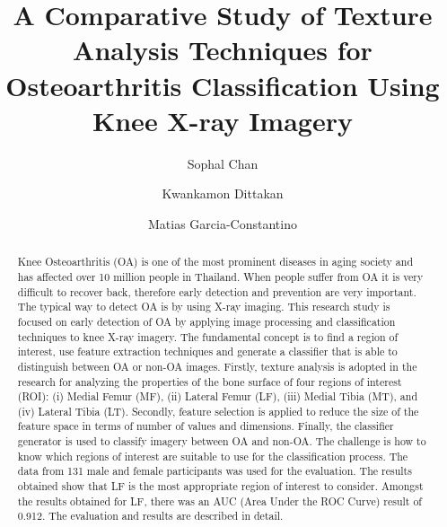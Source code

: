 \documentclass[review]{elsarticle}
\begin{document}
	
	\begin{frontmatter}
		
		\title{A Comparative Study of Texture Analysis Techniques for Osteoarthritis Classification Using Knee X-ray Imagery}
		
		
		\author[mymainaddress]{Sophal Chan}
		\author[mymainaddress]{Kwankamon Dittakan}
		\author[mysecondaryaddress]{Matias Garcia-Constantino}
		
		
		
		\address[mymainaddress]{College of Computing, Prince of Songkla University, 80, Moo 1, Vichitsongkram Rd, Kathu, Kathu, Phuket, Thailand 83120}
		\address[mysecondaryaddress]{School of Computing, Ulster University, Shore Road, Newtownabbey, County Antrim, BT37 0QB, United Kingdom}
		
		\begin{abstract}
			Knee Osteoarthritis (OA) is one of the most prominent diseases in aging society and has affected over 10 million people in Thailand. When people suffer from OA it is very difficult to recover back, therefore early detection and prevention are very important. The typical way to detect OA is by using X-ray imaging. This research study is focused on early detection of OA by applying image processing and classification techniques to knee X-ray imagery. The fundamental concept is to find a region of interest, use feature extraction techniques and generate a classiﬁer that is able to distinguish between OA or non-OA images. Firstly, texture analysis is adopted in the research for analyzing the properties of the bone surface of four regions of interest (ROI): (i) Medial Femur (MF), (ii) Lateral Femur (LF), (iii) Medial Tibia (MT), and (iv) Lateral Tibia (LT). Secondly, feature selection is applied to reduce the size of the feature space in terms of number of values and dimensions. Finally, the classifier generator is used to classify imagery between OA and non-OA. The challenge is how to know which regions of interest are suitable to use for the classification process. The data from 131 male and female participants was used for the evaluation. The results obtained show that LF is the most appropriate region of interest to consider. Amongst the results obtained for LF, there was an AUC (Area Under the ROC Curve) result of 0.912. The evaluation and results are described in detail.
		\end{abstract}
		

\end{frontmatter}
\end{document}
